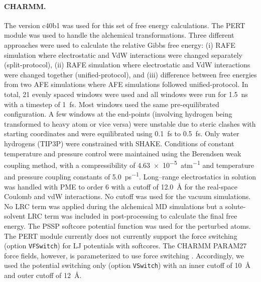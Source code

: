 \documentclass[journal=jctcce,manuscript=article]{achemso}
\newcommand{\inpopt}[1]{\texttt{#1}}
\begin{document}
\paragraph{CHARMM.}
The version c40b1 was used for this set of free energy calculations.
The PERT module was used to handle the alchemical transformations.
%
Three different approaches were used to calculate the relative Gibbs free energy: (i) RAFE simulation where electrostatic and VdW interactions were changed separately (split-protocol), (ii) RAFE simulation where electrostatic and VdW interactions were changed together (unified-protocol), and (iii) difference between free energies from two AFE simulations where AFE simulations followed unified-protocol.
%
In total, 21 evenly spaced windows were used and all windows were run for \SI{1.5}{ns} with a timestep of \SI{1}{fs}.
Most windows used the same pre-equilibrated configuration.
A few windows at the end-points (involving hydrogen being transformed to heavy atom or vice versa) were unstable due to steric clashes with starting coordinates and were equilibrated using \SI{0.1}{fs} to \SI{0.5}{fs}.
%
Only water hydrogens (TIP3P) were constrained with SHAKE.
%
Conditions of constant temperature and pressure control were maintained using the Berendsen weak coupling method,
with a compressibility of \SI{4.63e-5}{atm^{-1}} and temperature and pressure coupling constants of \SI{5.0}{ps^{-1}}.
%
Long--range electrostatics in solution was handled with PME to order 6 with a cutoff of \SI{12.0}{\angstrom} for the real-space Coulomb and vdW interactions.
No cutoff was used for the vacuum simulations.
%
 No LRC term was applied during the alchemical MD simulations but a solute-solvent LRC term was included in post-processing to calculate the final free energy.
%
The PSSP softcore potential function was used for the perturbed atoms.
The PERT module currently does not currently support the force switching (option \inpopt{VFSwitch}) for LJ potentials with softcores.
The CHARMM PARAM27 force fields, however, is parameterized to use force switching \cite{JCC:JCC21287}.
Accordingly, we used the potential switching only (option \inpopt{VSwitch}) with an inner cutoff of \SI{10}{\angstrom} and outer cutoff of \SI{12}{\angstrom}.
\end{document}
